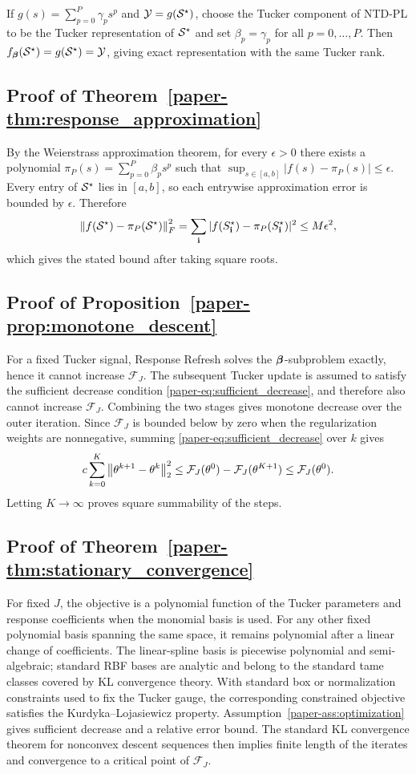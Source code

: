 If $g(s)=\sum_{p=0}^{P}\gamma_p s^p$ and $\mathcal{Y}=g(\mathcal{S}^\star)$, choose the
Tucker component of NTD-PL to be the Tucker representation of
$\mathcal{S}^\star$ and set $\beta_p=\gamma_p$ for all $p=0,\ldots,P$. Then
$f_{\boldsymbol{\beta}}(\mathcal{S}^\star)=g(\mathcal{S}^\star)=\mathcal{Y}$, giving exact representation with the
same Tucker rank.

\subsection{Proof of Theorem~\ref{paper-thm:response_approximation}}

By the Weierstrass approximation theorem, for every $\epsilon>0$ there exists
a polynomial $\pi_P(s)=\sum_{p=0}^{P}\beta_ps^p$ such that
$\sup_{s\in[a,b]}|f(s)-\pi_P(s)|\le\epsilon$. Every entry of $\mathcal{S}^\star$ lies in
$[a,b]$, so each entrywise approximation error is bounded by $\epsilon$.
Therefore
\[
  \left\lVert f(\mathcal{S}^\star)-\pi_P(\mathcal{S}^\star) \right\rVert_F^2
  =
  \sum_{\mathbf{i}}
  |f(S^\star_{\mathbf{i}})-\pi_P(S^\star_{\mathbf{i}})|^2
  \le
  M\epsilon^2,
\]
which gives the stated bound after taking square roots.

\subsection{Proof of Proposition~\ref{paper-prop:monotone_descent}}

For a fixed Tucker signal, Response Refresh solves the $\boldsymbol{\beta}$-subproblem
exactly, hence it cannot increase $\mathcal{F}_J$. The subsequent Tucker
update is assumed to satisfy the sufficient decrease condition
\eqref{paper-eq:sufficient_decrease}, and therefore also cannot increase
$\mathcal{F}_J$. Combining the two stages gives monotone decrease over the
outer iteration. Since $\mathcal{F}_J$ is bounded below by zero when the
regularization weights are nonnegative, summing
\eqref{paper-eq:sufficient_decrease} over $k$ gives
\[
  c\sum_{k=0}^{K}\left\lVert \theta^{k+1}-\theta^k \right\rVert_2^2
  \le
  \mathcal{F}_J(\theta^0)-\mathcal{F}_J(\theta^{K+1})
  \le
  \mathcal{F}_J(\theta^0).
\]
Letting $K\to\infty$ proves square summability of the steps.

\subsection{Proof of Theorem~\ref{paper-thm:stationary_convergence}}

For fixed $J$, the objective is a polynomial function of the Tucker parameters
and response coefficients when the monomial basis is used. For any other fixed
polynomial basis spanning the same space, it remains polynomial after a linear
change of coefficients. The linear-spline basis is piecewise polynomial and
semi-algebraic; standard RBF bases are analytic and belong to the
standard tame classes covered by KL convergence theory. With
standard box or normalization constraints used to fix the Tucker gauge, the
corresponding constrained objective satisfies the Kurdyka--Lojasiewicz
property. Assumption~\ref{paper-ass:optimization} gives sufficient decrease and a
relative error bound. The standard KL convergence theorem for nonconvex descent
sequences then implies finite length of the iterates and convergence to a
critical point of $\mathcal{F}_J$.

